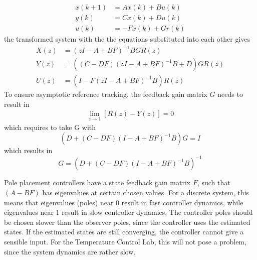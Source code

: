 \begin{align*}
    x(k+1) &= Ax(k)+Bu(k) \\
    y(k) &= Cx(k)+Du(k) \\
    u(k) &= -Fx(k) + Gr(k)
\end{align*}
the transformed system with the the equations substituted into each other gives
\begin{align*}
    X(z) &= (zI-A+BF)^{-1}BGR(z) \\
    Y(z) &=  ((C-DF)(zI-A+BF)^{-1}B+D)GR(z)\\
    U(z) &= (I-F(zI-A+BF)^{-1}B)R(z)
\end{align*}
To ensure asymptotic reference tracking, the feedback gain matrix $G$ needs to result in 
\begin{align*}
    \lim_{z \to 1}[R(z)-Y(z)]=0
\end{align*}
which requires to take G with
$$
(D+(C-DF)(I-A+BF)^{-1}B)G=I
$$
which results in
\begin{equation}
G = (D+(C-DF)(I-A+BF)^{-1}B)^{-1} \label{eq:refGain}    
\end{equation}

Pole placement controllers have a state feedback gain matrix $F$, such that $(A-BF)$ has eigenvalues at certain chosen values. For a discrete system, this means that eigenvalues (poles) near $0$ result in fast controller dynamics, while eigenvalues near $1$ result in slow controller dynamics. The controller poles should be chosen slower than the observer poles, since the controller uses the estimated states. If the estimated states are still converging, the controller cannot give a sensible input. For the Temperature Control Lab, this will not pose a problem, since the system dynamics are rather slow.\\

